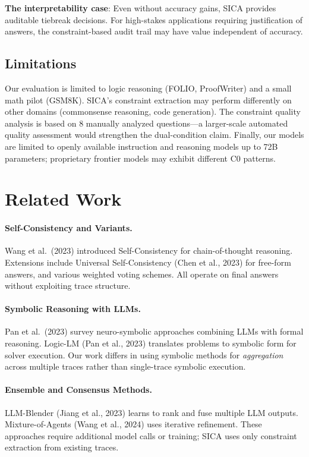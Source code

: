 \documentclass[11pt,a4paper]{article}
\begin{document}
\textbf{The interpretability case}: Even without accuracy gains, SICA provides auditable tiebreak decisions. For high-stakes applications requiring justification of answers, the constraint-based audit trail may have value independent of accuracy.

\subsection{Limitations}

Our evaluation is limited to logic reasoning (FOLIO, ProofWriter) and a small math pilot (GSM8K). SICA's constraint extraction may perform differently on other domains (commonsense reasoning, code generation). The constraint quality analysis is based on 8 manually analyzed questions---a larger-scale automated quality assessment would strengthen the dual-condition claim. Finally, our models are limited to openly available instruction and reasoning models up to 72B parameters; proprietary frontier models may exhibit different C0 patterns.

\section{Related Work}

\paragraph{Self-Consistency and Variants.} Wang et al.\ (2023) introduced Self-Consistency for chain-of-thought reasoning. Extensions include Universal Self-Consistency (Chen et al., 2023) for free-form answers, and various weighted voting schemes. All operate on final answers without exploiting trace structure.

\paragraph{Symbolic Reasoning with LLMs.} Pan et al.\ (2023) survey neuro-symbolic approaches combining LLMs with formal reasoning. Logic-LM (Pan et al., 2023) translates problems to symbolic form for solver execution. Our work differs in using symbolic methods for \emph{aggregation} across multiple traces rather than single-trace symbolic execution.

\paragraph{Ensemble and Consensus Methods.} LLM-Blender (Jiang et al., 2023) learns to rank and fuse multiple LLM outputs. Mixture-of-Agents (Wang et al., 2024) uses iterative refinement. These approaches require additional model calls or training; SICA uses only constraint extraction from existing traces.
\end{document}
